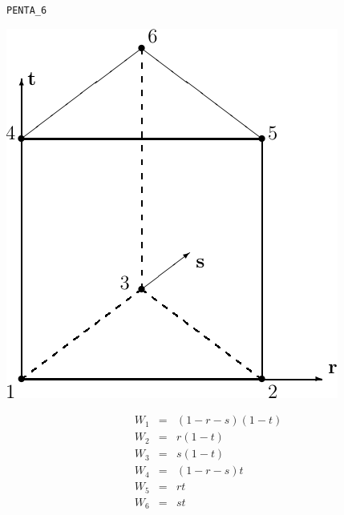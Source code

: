 \vspace{\baselineskip}
\texttt{PENTA\_6}\\[-2\baselineskip]
\begin{center}
\begin{minipage}[t]{0.5\linewidth}
   \centering
   \vspace{0pt}
   \includegraphics{cnct.figs/cnct_unst_penta6}
\end{minipage}%
\begin{minipage}[t]{0.5\linewidth}
   \vspace{-\abovedisplayskip}
   \begin{eqnarray*}
      W_1 &=& (1-r-s)(1-t) \\
      W_2 &=& r(1-t) \\
      W_3 &=& s(1-t) \\
      W_4 &=& (1-r-s)t \\
      W_5 &=& rt \\
      W_6 &=& st
   \end{eqnarray*}
\end{minipage}
\end{center}

